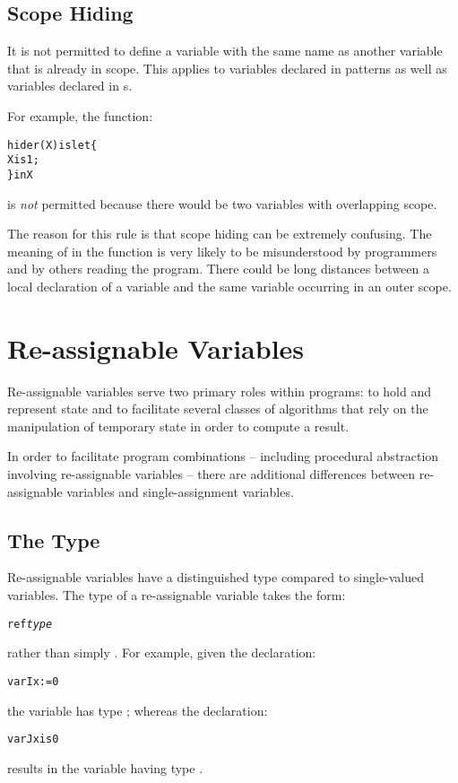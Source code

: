 \subsection{Scope Hiding}
\label{scopeHiding}
It is not permitted to define a variable with the same name as another variable that is already in scope. This applies to variables declared in patterns as well as variables declared in s.

For example, the function:
\begin{alltt}
hider(X) is let\{
  X is 1;
\} in X
\end{alltt}
is \emph{not} permitted because there would be two  variables with overlapping scope.
\begin{aside}
The reason for this rule is that scope hiding can be extremely confusing. The meaning of  in the  function is very likely to be misunderstood by programmers and by others reading the program. There could be long distances between a local declaration of a variable and the same variable occurring in an outer scope.
\end{aside}

\section{Re-assignable Variables}
\label{reassignableVars}

Re-assignable variables serve two primary roles within programs: to hold and represent state and to facilitate several classes of algorithms that rely on the manipulation of temporary state in order to compute a result.

In order to facilitate program combinations -- including procedural abstraction involving re-assignable variables -- there are additional differences between re-assignable variables and single-assignment variables.

\subsection{The  Type}
\label{refType}
Re-assignable variables have a distinguished type compared to single-valued variables. The type of a re-assignable variable takes the form:
\begin{alltt}
ref \emph{type}
\end{alltt}
rather than simply . For example, given the declaration:
\begin{alltt}
var Ix := 0
\end{alltt}
the variable  has type ; whereas the declaration:
\begin{alltt}
var Jx is 0
\end{alltt}
results in the variable  having type .

